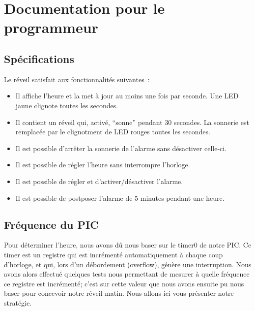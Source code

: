 \documentclass[12pt,a4paper]{article}
\begin{document}
\section{Documentation pour le programmeur}
    
    \subsection{Spécifications}
    Le réveil satisfait aux fonctionnalités suivantes~:
    \begin{itemize}
    \item Il affiche l'heure et la met à jour au moins une fois par seconde. Une LED jaune clignote toutes les secondes.
    \item Il contient un réveil qui, activé, ``sonne'' pendant 30 secondes. La sonnerie est remplacée par le clignotment de LED rouges toutes les secondes.
    \item Il est possible d'arrêter la sonnerie de l'alarme sans désactiver celle-ci.
    \item Il est possible de régler l'heure sans interrompre l'horloge.
    \item Il est possible de régler et d'activer/désactiver l'alarme.
    \item Il est possible de postposer l'alarme de 5 minutes pendant une heure.
    \end{itemize}
    
    \subsection{Fréquence du PIC}
    \label{subsec:freq}
    
    Pour déterminer l'heure, nous avons dû nous baser sur le timer0 de notre PIC. Ce timer est un registre qui est incrémenté automatiquement à chaque coup d'horloge, et qui, lors d'un débordement (overflow), génère une interruption. Nous avons alors effectué quelques tests nous permettant de mesurer à quelle fréquence ce registre est incrémenté; c'est sur cette valeur que nous avons ensuite pu nous baser pour concevoir notre réveil-matin. Nous allons ici vous présenter notre stratégie.\\
  
\end{document}
